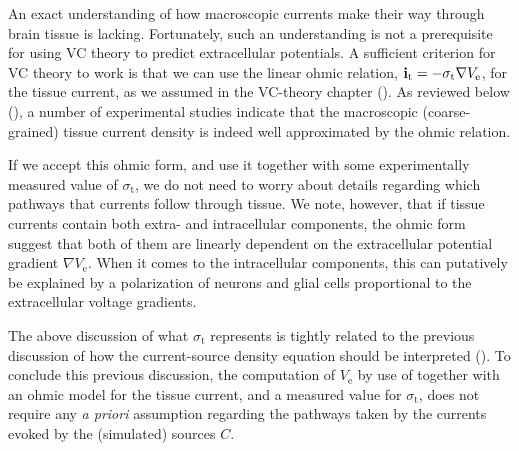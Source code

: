 An exact understanding of how macroscopic currents make their way through brain tissue is lacking. 
Fortunately, such an understanding is not a prerequisite for using VC theory to predict extracellular potentials.
A sufficient criterion for VC theory to work is that we can use the linear ohmic relation, 
${\bf i}_\text{t} = -\sigma_\text{t} \nabla V_\text{e}$, for the tissue current, 
as we assumed in the VC-theory chapter (). 
As reviewed below (), 
a number of experimental studies indicate that the macroscopic (coarse-grained) tissue current density is indeed
well approximated by the ohmic relation.

If we accept this ohmic form, and use it together with some experimentally measured value of $\sigma_\text{t}$, 
we do not need to worry about details regarding which pathways that currents follow through tissue. 
We note, however, that if tissue currents contain both extra- and intracellular components, 
the ohmic form suggest that both of them are linearly dependent on the extracellular
potential gradient $\nabla V_\text{e}$. When it comes to the intracellular components, 
this can putatively be explained by a polarization of neurons and glial cells
proportional to the extracellular voltage gradients. 

The above discussion of what $\sigma_\text{t}$ represents is tightly related to the previous discussion
of how the current-source density equation should be interpreted ().
To conclude this previous discussion, the computation of $V_\text{e}$ by use of  together with 
an ohmic model for the tissue current, and a measured value for $\sigma_\text{t}$, 
does not require any \textit{a priori} assumption regarding the pathways 
taken by the currents evoked by the (simulated) sources $C$.


